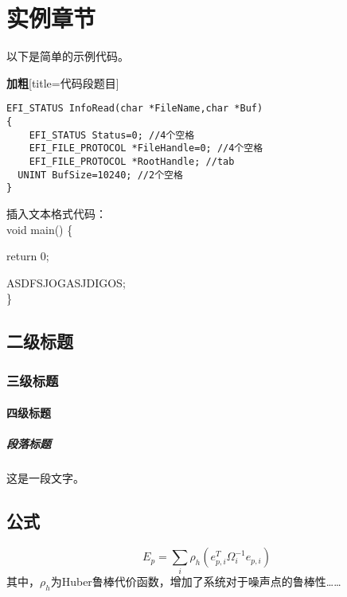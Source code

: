 \chapter{实例章节}
\label{cha:introduction}

以下是简单的示例代码。
\par \textbf{加粗}[title=代码段题目]

\begin{lstlisting}
EFI_STATUS InfoRead(char *FileName,char *Buf)
{
    EFI_STATUS Status=0; //4个空格
    EFI_FILE_PROTOCOL *FileHandle=0; //4个空格
	EFI_FILE_PROTOCOL *RootHandle; //tab
  UNINT BufSize=10240; //2个空格
}
\end{lstlisting}

插入文本格式代码：
\\ void main() \{
\par return 0;
\par ASDFSJOGASJDIGOS;
\\ \}
\section{二级标题}

\subsection{三级标题}

\subsubsection{四级标题}

\paragraph{段落标题}

这是一段文字。

\section{公式}
\label{sec:equation}

\begin{equation}
\label{eq:error}
	E_p=\sum_i\rho_h(e_{p,i}^T\Omega_i^{-1}e_{p,i})
\end{equation}
其中，$\rho_h$为Huber鲁棒代价函数，增加了系统对于噪声点的鲁棒性……

